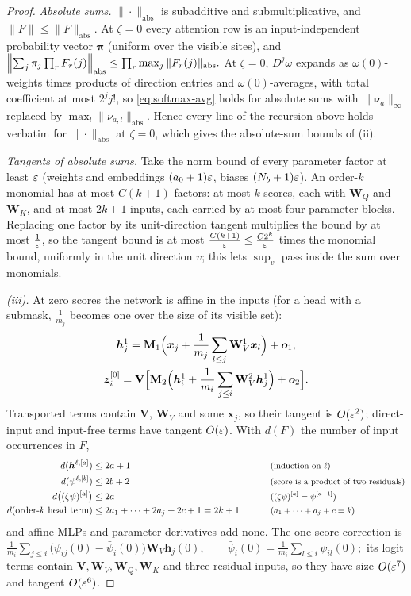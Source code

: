 \begin{proof}
\emph{Absolute sums.} $\|\cdot\|_{\mathrm{abs}}$ is subadditive and submultiplicative, and $\|F\|\le\|F\|_{\mathrm{abs}}$. At $\zeta=0$ every attention row is an
input-independent probability vector $\bm\pi$ (uniform over the visible sites), and
 $\Bigl\|\textstyle\sum_j\pi_j\prod_rF_r(j)\Bigr\|_{\mathrm{abs}}\le\prod_r\max_j\|F_r(j)\|_{\mathrm{abs}} .$ 
At $\zeta=0$, $D^j\omega$ expands as $\omega(0)$-weights times products of direction entries and $\omega(0)$-averages, with total coefficient at most $2^jj!$,
so \cref{eq:softmax-avg} holds for absolute sums with $\|\bm\nu_a\|_\infty$ replaced by $\max_l\|\nu_{a,l}\|_{\mathrm{abs}}$. Hence every line of the recursion
above holds verbatim for $\|\cdot\|_{\mathrm{abs}}$ at $\zeta=0$, which gives the absolute-sum bounds of (ii).

\emph{Tangents of absolute sums.} Take the norm bound of every parameter factor at least $\varepsilon$ (weights and embeddings $(a_0+1)\varepsilon$,
biases $(N_b+1)\varepsilon$). An order-$k$ monomial has at most $C(k+1)$ factors: at most $k$ scores, each with $\mathbf W_Q$ and $\mathbf W_K$, and at
most $2k+1$ inputs, each carried by at most four parameter blocks. Replacing one factor by its unit-direction tangent multiplies the bound by at
most $\frac{1}{\varepsilon}$, so the tangent bound is at most $\frac{C(k+1)}{\varepsilon}\le\frac{C2^k}{\varepsilon}$ times the monomial bound, uniformly in the unit direction
$v$; this lets $\sup_v$ pass inside the sum over monomials.

\emph{(iii).} At zero scores the network is affine in the inputs (for a head with a submask, $\frac{1}{m_j}$ becomes one over the size of its
visible set):
\begin{gather*}
 \bm h^1_j=\mathbf M_1\Bigl(\bm x_j+\frac{1}{m_j}\sum_{l\le j}\mathbf W^1_V\bm x_l\Bigr)+\bm o_1,\\
 \bm z^{[0]}_i=\mathbf V\Bigl[\mathbf M_2\Bigl(\bm h^1_i+\frac{1}{m_i}\sum_{j\le i}\mathbf W^2_V\bm h^1_j\Bigr)+\bm o_2\Bigr].
\end{gather*}
Transported terms contain $\mathbf V$, $\mathbf W_V$ and some $\bm x_j$, so their tangent is $O(\varepsilon^2)$; direct-input and input-free terms have tangent $O(\varepsilon)$.
With $d(F)$ the number of input occurrences in $F$,
\begin{alignat*}{2}
 d(\bm h^{\ell,[a]})&\le2a+1 &\qquad& \why{induction on $\ell$}\\
 d(\psi^{\ell,[b]})&\le2b+2 && \why{score is a product of two residuals}\\
 d\bigl((\zeta\psi)^{[a]}\bigr)&\le2a && \why{$(\zeta\psi)^{[a]}=\psi^{[a-1]}$}\\
 d(\text{order-$k$ head term})&\le2a_1+\cdots+2a_j+2c+1=2k+1 && \why{$a_1+\cdots+a_j+c=k$}
\end{alignat*}
and affine MLPs and parameter derivatives add none. The one-score correction is
 $\frac{1}{m_i}\sum_{j\le i}\bigl(\psi_{ij}(0)-\bar\psi_i(0)\bigr)\mathbf W_V\bm h_j(0),\qquad \bar\psi_i(0)=\frac{1}{m_i}\sum_{l\le i}\psi_{il}(0);$ 
its logit terms contain $\mathbf V,\mathbf W_V,\mathbf W_Q,\mathbf W_K$ and three residual inputs, so they have size $O(\varepsilon^7)$ and tangent $O(\varepsilon^6)$.

\end{proof}

